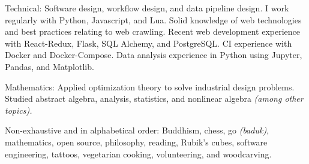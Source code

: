 \documentclass[10pt,a4paper]{article} %
\begin{document}
\inlineheadsection %
{Technical:}
{Software design, workflow design, and data pipeline design. I work regularly with Python, Javascript, and Lua. Solid knowledge of web technologies and best practices relating to web crawling. Recent web development experience with React-Redux, Flask, SQL Alchemy, and PostgreSQL. CI experience with Docker and Docker-Compose. Data analysis experience in Python using Jupyter, Pandas, and Matplotlib.}


\inlineheadsection %
{Mathematics:}
{Applied optimization theory to solve industrial design problems. Studied abstract algebra, analysis, statistics, and nonlinear algebra \textit{(among other topics).}}


\spacedhrule{1.6em}{-0.4em} %



\inlineheadsection %
{Non-exhaustive and in alphabetical order:}
{Buddhism, chess, go \textit{(baduk)}, mathematics, open source, philosophy, reading, Rubik's cubes, software engineering, tattoos, vegetarian cooking, volunteering, and woodcarving.}

\end{document}
